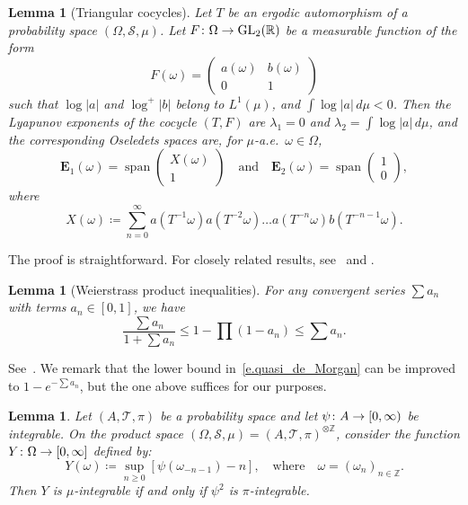 \documentclass[10pt]{amsart}
\newtheorem{lemm}[theo]{Lemma}\newtheorem{prop}[theo]{Proposition}\newtheorem{coro}[theo]{Corollary}\newtheorem{conj}[theo]{Conjecture}
\theoremstyle{definition}\newtheorem{defi}[theo]{Definition}\newtheorem{rema}[theo]{Remark}\newtheorem{exam}[theo]{Example}\newtheorem{exem}[theo]{Example}\newtheorem{nota}[theo]{Notation}
\newcommand{\smallplus}{+}\newcommand{\smallminus}{-}\newcommand{\smalltimes}{\times}\newcommand{\smallpm}{\pm}\newcommand{\smallmp}{\mp}
\DeclareMathOperator{\spann}{span}
\newcommand{\Z}{\mathbb{Z}}
\newcommand{\R}{\mathbb{R}}
\newcommand{\E}{\mathbf{E}}
\newcommand{\clS}{\mathcal{S}}
\newcommand{\clT}{\mathcal{T}}
\DeclareMathOperator{\GL}{GL}
\renewcommand*{\to}{\mathchoice{\longrightarrow}{\rightarrow}{\rightarrow}{\rightarrow}}
\begin{document}
\begin{lemm}[Triangular cocycles] \label{l.triangular}
Let $T$ be an ergodic automorphism of a probability space $(\Omega,\clS,\mu)$. Let $F \colon \Omega \to \GL_2(\R)$ be a measurable function of the form
\begin{equation}
F(\omega) =
\begin{pmatrix} 
a(\omega) & b(\omega) \\ 0 & 1
\end{pmatrix}
\end{equation}
such that $\log|a|$ and $\log^{\smallplus} |b|$ belong to $L^1(\mu)$, and $\int \log|a| \, d\mu < 0$. Then the Lyapunov exponents of the cocycle $(T,F)$ are $\lambda_1 = 0$ and $\lambda_2 = \int \log|a| \, d\mu$, and the corresponding Oseledets spaces are, for $\mu$-a.e.~$\omega \in \Omega$,
\begin{equation}
\E_1(\omega) = \spann
\begin{pmatrix} 
X(\omega) \\ 1
\end{pmatrix} 
\quad \text{and} \quad
\E_2(\omega) = \spann 
\begin{pmatrix}
1 \\ 0
\end{pmatrix},
\end{equation}
where
\begin{equation}\label{e.X_series}
X(\omega) \coloneqq \sum_{n=0}^\infty a\left(T^{-1} \omega\right) a\left(T^{-2} \omega\right)\dots a\left(T^{-n} \omega\right) b\left(T^{-n-1} \omega\right).
\end{equation}
\end{lemm}

The proof is straightforward. For closely related results, see~\cite[Section~5]{kifer} and \cite[p.~161]{arnold}.


\begin{lemm}[Weierstrass product inequalities]\label{l.Weierstrass}
For any convergent series $\sum a_n$ with terms $a_n \in [0,1]$, we have
\begin{equation}\label{e.quasi_de_Morgan}
\frac{\sum a_n}{1 + \sum a_n} \le 1 - \prod (1-a_n) \le \sum a_n.
\end{equation}
\end{lemm}

See~\cite[Section~38]{Bromwich}. We remark that the lower bound in~\eqref{e.quasi_de_Morgan} can be improved to $1 - e^{-\sum a_n}$, but the one above suffices for our purposes.


\begin{lemm}\label{l.double-edged}
Let $(A,\clT,\pi)$ be a probability space and let $\psi \colon A \to [0,\infty)$ be integrable. On the product space $(\Omega,\clS,\mu) = (A,\clT,\pi)^{\otimes \Z}$, consider the function $Y \colon \Omega \to [0,\infty]$ defined by:
\begin{equation}\label{e.def_Y}
Y(\omega) \coloneqq \sup_{n \ge 0} \left[\psi(\omega_{-n-1}) - n \right], \quad \text{where}\quad \omega = (\omega_n)_{n \in \Z}.
\end{equation}
Then $Y$ is $\mu$-integrable if and only if $\psi^2$ is $\pi$-integrable.
\end{lemm}
\end{document}
